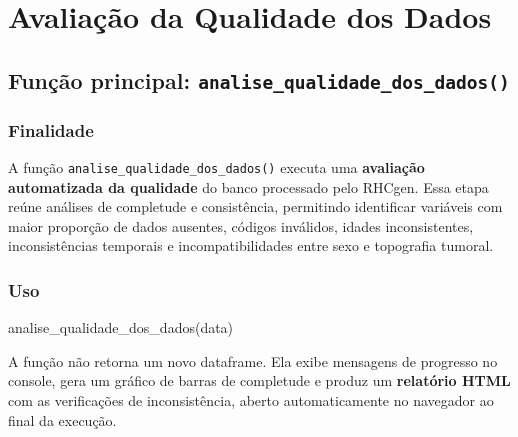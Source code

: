 \documentclass[
  brazilian,
  a4paper,
  oneside]{scrbook}
\newenvironment{Shaded}{\begin{snugshade}}{\end{snugshade}}
\newcommand{\FunctionTok}[1]{\textcolor[rgb]{0.28,0.35,0.67}{#1}}
\newcommand{\NormalTok}[1]{\textcolor[rgb]{0.00,0.23,0.31}{#1}}
\begin{document}

\chapter{Avaliação da Qualidade dos
Dados}\label{avaliauxe7uxe3o-da-qualidade-dos-dados}

\section{\texorpdfstring{Função principal:
\texttt{analise\_qualidade\_dos\_dados()}}{Função principal: analise\_qualidade\_dos\_dados()}}\label{funuxe7uxe3o-principal-analise_qualidade_dos_dados}

\subsection{Finalidade}\label{finalidade-5}

A função \texttt{analise\_qualidade\_dos\_dados()} executa uma
\textbf{avaliação automatizada da qualidade} do banco processado pelo
RHCgen. Essa etapa reúne análises de completude e consistência,
permitindo identificar variáveis com maior proporção de dados ausentes,
códigos inválidos, idades inconsistentes, inconsistências temporais e
incompatibilidades entre sexo e topografia tumoral.

\subsection{Uso}\label{uso-7}

\begin{Shaded}
\begin{Highlighting}[]
\FunctionTok{analise\_qualidade\_dos\_dados}\NormalTok{(data)}
\end{Highlighting}
\end{Shaded}

\begin{tcolorbox}[enhanced jigsaw, arc=.35mm, bottomrule=.15mm, bottomtitle=1mm, breakable, colback=white, colbacktitle=quarto-callout-note-color!10!white, colframe=quarto-callout-note-color-frame, coltitle=black, left=2mm, leftrule=.75mm, opacityback=0, opacitybacktitle=0.6, rightrule=.15mm, title=\textcolor{quarto-callout-note-color}{\faInfo}\hspace{0.5em}{Saídas produzidas}, titlerule=0mm, toprule=.15mm, toptitle=1mm]

A função não retorna um novo dataframe. Ela exibe mensagens de progresso
no console, gera um gráfico de barras de completude e produz um
\textbf{relatório HTML} com as verificações de inconsistência, aberto
automaticamente no navegador ao final da execução.

\end{tcolorbox}
\end{document}
